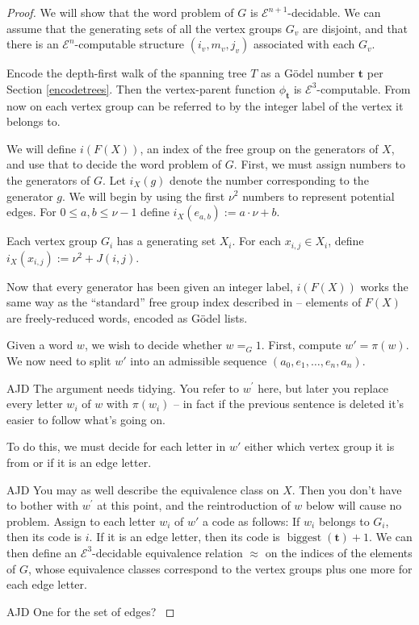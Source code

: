 \documentclass[a4paper]{article}
\newcommand{\grz}[1]{$\mathcal{E}^{#1}$}	%
\newcommand{\tvec}{\mathbf{t}}	%
\theoremstyle{plain}
\theoremstyle{definition}
\newenvironment{ad}{\noindent\color{blue} AJD }{}
\newcommand{\ajd}[1]{
\begin{ad} #1 \end{ad}}
\begin{document}
\begin{proof}
	We will show that the word problem of $G$ is \grz{n+1}-decidable. We can assume that the generating sets of all the vertex groups $G_v$ are disjoint, and that there is an \grz{n}-computable structure $(i_v,m_v,j_v)$ associated with 
each $G_v$.

Encode the depth-first walk of the spanning tree $T$ as a G\"odel number $\tvec$ per Section \ref{encodetrees}. Then the vertex-parent function $\phi_{\tvec}$ is \grz{3}-computable. From now on each vertex group can be referred to by the integer label of the vertex it belongs to.

We will define $i(F(X))$, an index of the free group on the generators of $X$, and use that to decide the word problem of $G$. First, we must assign numbers to the generators of $G$. Let $i_X(g)$ denote the number corresponding to the generator $g$. We will begin by using the first $\nu^2$ numbers to represent potential edges. For $0 \leq a,b \leq \nu - 1$ define $i_X(e_{a,b}) := a \cdot \nu + b$.

Each vertex group $G_i$ has a generating set $X_i$. For each $x_{i,j} \in X_i$, define $i_X(x_{i,j}) := \nu^2 + J(i,j)$.

Now that every generator has been given an integer label, $i(F(X))$ works the same way as the ``standard'' free group index described in \cite[Lemma 3.1]{Cannonito_1973} -- elements of $F(X)$ are freely-reduced words, encoded as G\"odel lists.

Given a word $w$, we wish to decide whether $w =_G 1$. First, compute $w' = \pi(w)$. We now need to split $w'$ into an admissible sequence $(a_0,e_1,\dots,e_n,a_n)$. 

\ajd{The argument needs tidying. You refer to $w^\prime$
here, but later you replace every letter  $w_i$ of $w$ with $\pi(w_i)$ --
in fact if  the previous sentence is deleted it's easier to follow
what's going on.}

To do this, we must decide for each letter in $w'$ either which vertex group it is from or if it is an edge letter. 
\ajd{You may as well describe the equivalence class on $X$. Then you don't
have to bother with $w^\prime$ at this point, and the reintroduction of $w$ 
below will cause no problem.} 
Assign to each letter $w_i$ of $w'$ a code as follows: If $w_i$ belongs to $G_i$, then its code is $i$. If it is an edge letter, then its code is $\operatorname{biggest}(\tvec)+1$. We can then define an \grz{3}-decidable equivalence relation $\approx$ on the indices of the elements of $G$, whose equivalence classes correspond to the vertex groups plus one more for each edge letter. 
\ajd{One for the set of edges?}



\end{proof}
\end{document}
